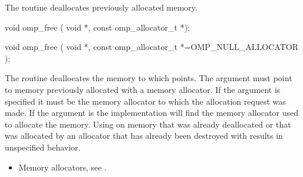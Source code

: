 \begin{ccppspecific}
\summary
The  routine deallocates previously allocated memory.

\format

\begin{cspecific}
\begin{ompcFunction}
void omp_free ( void *, const omp_allocator_t *);
\end{ompcFunction}
\end{cspecific}
\begin{cppspecific}
\begin{ompcFunction}
void omp_free (
  void *,
  const omp_allocator_t *=OMP_NULL_ALLOCATOR
);
\end{ompcFunction}
\end{cppspecific}

\effect

The  routine deallocates the memory to which  points. The  argument must point to memory previously allocated with a memory allocator. If the  argument is specified it must be the memory allocator to which the allocation request was made. If the  argument is  the implementation will find the memory allocator used to allocate the memory. Using  on memory that was already deallocated or that was allocated by an allocator that has already been destroyed with  results in unspecified behavior.

\crossreferences
\begin{itemize}
\item Memory allocators, see .
\end{itemize}

\end{ccppspecific}
